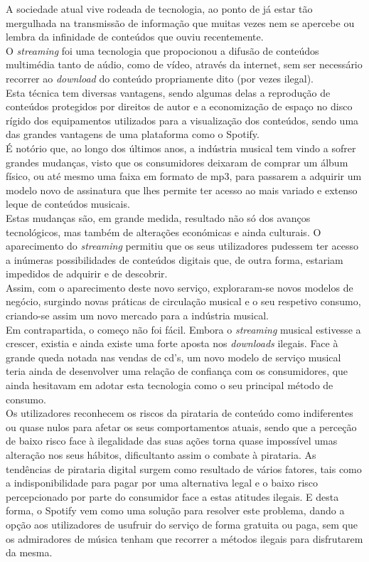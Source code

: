A sociedade atual vive rodeada de tecnologia, ao ponto de já estar tão mergulhada na transmissão de informação que muitas vezes nem se apercebe ou lembra da infinidade de conteúdos que ouviu recentemente.\\
O \textit{streaming} foi uma tecnologia que propocionou a difusão de conteúdos multimédia tanto de aúdio, como de vídeo, através da internet, sem ser necessário recorrer ao \textit{download} do conteúdo propriamente dito (por vezes ilegal).\\
Esta técnica tem diversas vantagens, sendo algumas delas a reprodução de conteúdos protegidos por direitos de autor e a economização de espaço no disco rígido dos equipamentos utilizados para a visualização dos
conteúdos, sendo uma das grandes vantagens de uma plataforma como o Spotify.\\
É notório que, ao longo dos últimos anos, a indústria musical tem vindo a sofrer grandes mudanças, visto que os consumidores deixaram de comprar um álbum físico, ou até mesmo uma faixa em formato de \ac{mp3}, para passarem a adquirir um modelo novo de assinatura que lhes permite ter acesso ao mais variado e extenso leque de conteúdos musicais.\\
Estas mudanças são, em grande medida, resultado não só dos avanços tecnológicos, mas também de alterações económicas e ainda culturais. O aparecimento do \textit{streaming} permitiu que os seus utilizadores pudessem ter acesso a inúmeras possibilidades de conteúdos digitais que, de outra forma, estariam impedidos de adquirir e de descobrir.\\
Assim, com o aparecimento deste novo serviço, exploraram-se novos modelos de negócio, surgindo novas práticas de circulação musical e o seu respetivo consumo, criando-se assim um novo mercado para a indústria musical.\\
Em contrapartida, o começo não foi fácil. Embora o \textit{streaming} musical estivesse a crescer, existia e ainda existe uma forte aposta nos \textit{downloads} ilegais. Face à grande queda notada nas vendas de \ac{cd}’s, um novo modelo de serviço musical teria ainda de desenvolver uma relação de confiança com os consumidores, que ainda hesitavam em adotar esta tecnologia como o seu principal método de consumo.\\
Os utilizadores reconhecem os riscos da pirataria de conteúdo como indiferentes ou quase nulos para afetar os seus comportamentos atuais, sendo que a perceção de baixo risco face à ilegalidade das suas ações torna quase impossível umas alteração nos seus hábitos, dificultanto assim o combate à pirataria. As tendências de pirataria digital surgem como resultado de vários fatores, tais como a indisponibilidade para pagar por uma alternativa legal e o baixo risco percepcionado por parte do consumidor face a estas atitudes ilegais. E desta forma, o Spotify vem como uma solução para resolver este problema, dando a opção aos utilizadores de usufruir do serviço de forma gratuita ou paga, sem que os admiradores de música tenham que recorrer a métodos ilegais para disfrutarem da mesma.\\
